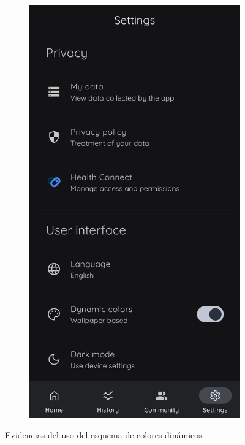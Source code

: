 \begin{figure}[htbp]
\begin{subfigure}[c]{0.4\textwidth}
                \end{subfigure}
                \hspace{0.1\textwidth}
                \begin{subfigure}[c]{0.4\textwidth}
                    \centering
                    \includegraphics[width=1\linewidth]{figures/pruebas/colores_dinamicos/Despues.png}
                \end{subfigure}
                \caption{Evidencias del uso del esquema de colores dinámicos}
                \label{figure:pruebas:colores_dinamicos}
            \end{figure}
            
